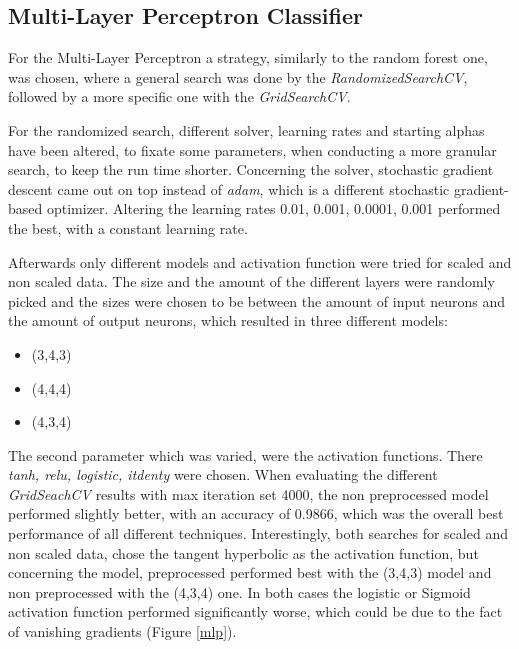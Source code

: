 
\subsection{Multi-Layer Perceptron Classifier}
For the Multi-Layer Perceptron a strategy, similarly to the random forest one,  was chosen, where a general search was done by the \textit{RandomizedSearchCV}, followed by a more specific one with the \textit{GridSearchCV}.

For the randomized search, different solver, learning rates and starting alphas have been altered, to fixate some parameters, when conducting a more granular search, to keep the run time shorter. Concerning the solver, stochastic gradient descent came out on top instead of \textit{adam}, which is a different stochastic gradient-based optimizer. Altering the learning rates 0.01, 0.001, 0.0001, 0.001 performed the best, with a constant learning rate.

Afterwards only different models and activation function were tried for scaled and non scaled data. The size and the amount of the different layers were randomly picked and the sizes were chosen to be between the amount of input neurons and the amount of output neurons, which resulted in three different models:

\begin{itemize}
\item (3,4,3)
\item (4,4,4)
\item (4,3,4)
\end{itemize}

The second parameter which was varied, were the activation functions. There \textit{tanh, relu, logistic, itdenty} were chosen. When evaluating the different \textit{GridSeachCV} results with max iteration set 4000, the non preprocessed model performed slightly better, with an accuracy of 0.9866, which was the overall best performance of all different techniques. Interestingly, both searches for scaled and non scaled data, chose the tangent hyperbolic as the activation function, but concerning the model, preprocessed performed best with the (3,4,3) model and non preprocessed with the (4,3,4) one. In both cases the logistic or Sigmoid activation function performed significantly worse, which could be due to the fact of vanishing gradients (Figure \ref{mlp}).

